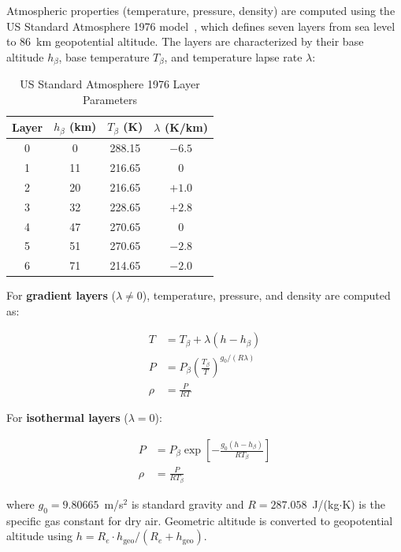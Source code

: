 \documentclass[conference]{IEEEtran}
\begin{document}
Atmospheric properties (temperature, pressure, density) are computed using the US Standard Atmosphere 1976 model~\cite{nasa1976atmosphere}, which defines seven layers from sea level to 86~km geopotential altitude. The layers are characterized by their base altitude $h_\beta$, base temperature $T_\beta$, and temperature lapse rate $\lambda$:

\begin{table}[htbp]
    \centering
    \caption{US Standard Atmosphere 1976 Layer Parameters}
    \label{tab:atmo_layers}
    \begin{tabular}{@{}cccc@{}}
        \toprule
        Layer & $h_\beta$ (km) & $T_\beta$ (K) & $\lambda$ (K/km) \\
        \midrule
        0 & 0 & 288.15 & $-6.5$ \\
        1 & 11 & 216.65 & 0 \\
        2 & 20 & 216.65 & $+1.0$ \\
        3 & 32 & 228.65 & $+2.8$ \\
        4 & 47 & 270.65 & 0 \\
        5 & 51 & 270.65 & $-2.8$ \\
        6 & 71 & 214.65 & $-2.0$ \\
        \bottomrule
    \end{tabular}
\end{table}

For \textbf{gradient layers} ($\lambda \neq 0$), temperature, pressure, and density are computed as:

\begin{align}
    T &= T_\beta + \lambda (h - h_\beta) \label{eq:atmo_T} \\
    P &= P_\beta \left(\frac{T_\beta}{T}\right)^{g_0 / (R\lambda)} \label{eq:atmo_P_grad} \\
    \rho &= \frac{P}{RT} \label{eq:atmo_rho}
\end{align}

For \textbf{isothermal layers} ($\lambda = 0$):

\begin{align}
    P &= P_\beta \exp\!\left[-\frac{g_0 (h - h_\beta)}{R T_\beta}\right] \label{eq:atmo_P_iso} \\
    \rho &= \frac{P}{R T_\beta} \label{eq:atmo_rho_iso}
\end{align}

\noindent where $g_0 = 9.80665$~m/s$^2$ is standard gravity and $R = 287.058$~J/(kg$\cdot$K) is the specific gas constant for dry air. Geometric altitude is converted to geopotential altitude using $h = R_e \cdot h_{\text{geo}} / (R_e + h_{\text{geo}})$.
\end{document}
